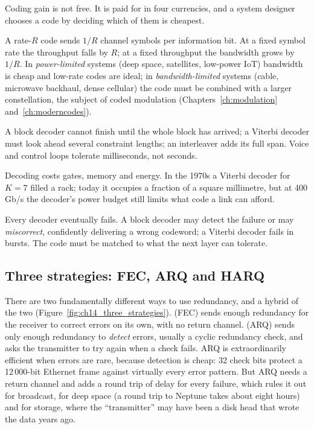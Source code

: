 Coding gain is not free. It is paid for in four currencies, and a system designer chooses a code by
deciding which of them is cheapest.
\begin{description}[style=nextline,leftmargin=1.2em,font=\sffamily\bfseries\small\color{navy}]
\item[Bandwidth or throughput.] A rate-$R$ code sends $1/R$ channel symbols per information bit.
At a fixed symbol rate the throughput falls by $R$; at a fixed throughput the bandwidth grows by
$1/R$. In \emph{power-limited} systems (deep space, satellites, low-power IoT) bandwidth is
cheap and low-rate codes are ideal; in \emph{bandwidth-limited} systems (cable, microwave
backhaul, dense cellular) the code must be combined with a larger constellation, the subject of
coded modulation (Chapters~\ref{ch:modulation} and~\ref{ch:moderncodes}).
\item[Latency.] A block decoder cannot finish until the whole block has arrived; a Viterbi
decoder must look ahead several constraint lengths; an interleaver adds its full span. Voice and
control loops tolerate milliseconds, not seconds.
\item[Complexity and power.] Decoding costs gates, memory and energy. In the 1970s a
Viterbi decoder for $K=7$ filled a rack; today it occupies a fraction of a square millimetre, but
at 400\,Gb/s the decoder's power budget still limits what code a link can afford.
\item[Error behaviour.] Every decoder eventually fails. A block decoder may detect the failure
or may \emph{miscorrect}, confidently delivering a wrong codeword; a Viterbi decoder fails in
bursts. The code must be matched to what the next layer can tolerate.
\end{description}

\subsection{Three strategies: FEC, ARQ and HARQ}

There are two fundamentally different ways to use redundancy, and a hybrid of the two
(Figure~\ref{fig:ch14_three_strategies}).  (FEC) sends enough
redundancy for the receiver to correct errors on its own, with no return channel.  (ARQ) sends only enough redundancy to \emph{detect} errors, usually a cyclic
redundancy check, and asks the transmitter to try again when a check fails. ARQ is extraordinarily
efficient when errors are rare, because detection is cheap: 32 check bits protect a 12\,000-bit
Ethernet frame against virtually every error pattern. But ARQ needs a return channel and adds a round
trip of delay for every failure, which rules it out for broadcast, for deep space (a round trip to
Neptune takes about eight hours) and for storage, where the ``transmitter'' may have been a disk head
that wrote the data years ago.

